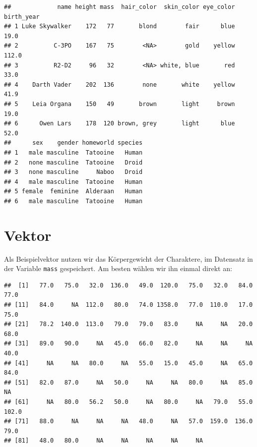 \documentclass[
]{book}
\newenvironment{Shaded}{\begin{snugshade}}{\end{snugshade}}
\newcommand{\NormalTok}[1]{#1}
\newcommand{\OtherTok}[1]{\textcolor[rgb]{0.56,0.35,0.01}{#1}}
\newcommand{\SpecialCharTok}[1]{\textcolor[rgb]{0.81,0.36,0.00}{\textbf{#1}}}
\newcounter{none} %
\begin{document}
\begin{verbatim}
##             name height mass  hair_color  skin_color eye_color birth_year
## 1 Luke Skywalker    172   77       blond        fair      blue       19.0
## 2          C-3PO    167   75        <NA>        gold    yellow      112.0
## 3          R2-D2     96   32        <NA> white, blue       red       33.0
## 4    Darth Vader    202  136        none       white    yellow       41.9
## 5    Leia Organa    150   49       brown       light     brown       19.0
## 6      Owen Lars    178  120 brown, grey       light      blue       52.0
##      sex    gender homeworld species
## 1   male masculine  Tatooine   Human
## 2   none masculine  Tatooine   Droid
## 3   none masculine     Naboo   Droid
## 4   male masculine  Tatooine   Human
## 5 female  feminine  Alderaan   Human
## 6   male masculine  Tatooine   Human
\end{verbatim}

\section{Vektor}\label{vektor-1}

Als Beispielvektor nutzen wir das Körpergewicht der Charaktere, im Datensatz in der Variable \texttt{mass} gespeichert. Am besten wählen wir ihn einmal direkt an:

\begin{Shaded}
\end{Shaded}

\begin{verbatim}
##  [1]   77.0   75.0   32.0  136.0   49.0  120.0   75.0   32.0   84.0   77.0
## [11]   84.0     NA  112.0   80.0   74.0 1358.0   77.0  110.0   17.0   75.0
## [21]   78.2  140.0  113.0   79.0   79.0   83.0     NA     NA   20.0   68.0
## [31]   89.0   90.0     NA   45.0   66.0   82.0     NA     NA     NA   40.0
## [41]     NA     NA   80.0     NA   55.0   15.0   45.0     NA   65.0   84.0
## [51]   82.0   87.0     NA   50.0     NA     NA   80.0     NA   85.0     NA
## [61]     NA   80.0   56.2   50.0     NA   80.0     NA   79.0   55.0  102.0
## [71]   88.0     NA     NA     NA   48.0     NA   57.0  159.0  136.0   79.0
## [81]   48.0   80.0     NA     NA     NA     NA     NA
\end{verbatim}
\end{document}
